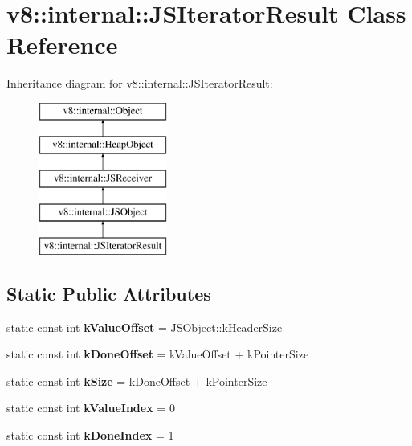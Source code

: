 \hypertarget{classv8_1_1internal_1_1_j_s_iterator_result}{}\section{v8\+:\+:internal\+:\+:J\+S\+Iterator\+Result Class Reference}
\label{classv8_1_1internal_1_1_j_s_iterator_result}
Inheritance diagram for v8\+:\+:internal\+:\+:J\+S\+Iterator\+Result\+:\begin{figure}[H]
\begin{center}
\leavevmode
\includegraphics[height=5.000000cm]{classv8_1_1internal_1_1_j_s_iterator_result}
\end{center}
\end{figure}
\subsection*{Static Public Attributes}
\begin{DoxyCompactItemize}
\item 
static const int {\bfseries k\+Value\+Offset} = J\+S\+Object\+::k\+Header\+Size\hypertarget{classv8_1_1internal_1_1_j_s_iterator_result_ad3bd3b361b771298e2f3d7fe97895fba}{}\label{classv8_1_1internal_1_1_j_s_iterator_result_ad3bd3b361b771298e2f3d7fe97895fba}

\item 
static const int {\bfseries k\+Done\+Offset} = k\+Value\+Offset + k\+Pointer\+Size\hypertarget{classv8_1_1internal_1_1_j_s_iterator_result_aae1880578295dc785f39437c190b6f85}{}\label{classv8_1_1internal_1_1_j_s_iterator_result_aae1880578295dc785f39437c190b6f85}

\item 
static const int {\bfseries k\+Size} = k\+Done\+Offset + k\+Pointer\+Size\hypertarget{classv8_1_1internal_1_1_j_s_iterator_result_a5d61d168283f7c3b16a3f794f3ca5259}{}\label{classv8_1_1internal_1_1_j_s_iterator_result_a5d61d168283f7c3b16a3f794f3ca5259}

\item 
static const int {\bfseries k\+Value\+Index} = 0\hypertarget{classv8_1_1internal_1_1_j_s_iterator_result_a6703ddfcb73d4a0e2eaaf69dcd33344b}{}\label{classv8_1_1internal_1_1_j_s_iterator_result_a6703ddfcb73d4a0e2eaaf69dcd33344b}

\item 
static const int {\bfseries k\+Done\+Index} = 1\hypertarget{classv8_1_1internal_1_1_j_s_iterator_result_aa8d774f7d9a32a503250b798c03e599d}{}\label{classv8_1_1internal_1_1_j_s_iterator_result_aa8d774f7d9a32a503250b798c03e599d}

\end{DoxyCompactItemize}
